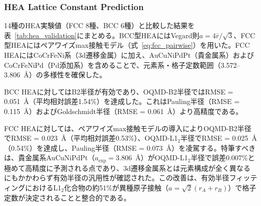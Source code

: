 \documentclass[a4paper,10pt,5p]{elsarticle}
\begin{document}
\subsubsection{HEA Lattice Constant Prediction}

14種のHEA実験値（FCC 8種、BCC 6種）と比較した結果を表~\ref{tab:hea_validation}にまとめる。BCC型HEAにはVegard則$a = 4\bar{r}/\sqrt{3}$、FCC型HEAにはペアワイズmax接触モデル（式~\ref{eq:fcc_pairwise}）を用いた。FCC HEAにはCoCrFeNi系（3d遷移金属）に加え、AuCuNiPdPt（貴金属系）およびCoCrFeNiPd（Pd添加系）を含めることで、元素系・格子定数範囲（3.572--3.806~\AA）の多様性を確保した。

BCC HEAに対してはB2半径が有効であり、OQMD-B2半径ではRMSE = 0.051~\AA（平均相対誤差1.54\%）を達成した。これはPauling半径（RMSE = 0.115~\AA）およびGoldschmidt半径（RMSE = 0.061~\AA）より高精度である。

FCC HEAに対しては、ペアワイズmax接触モデルの導入によりOQMD-B2半径でRMSE = 0.023~\AA（平均相対誤差0.53\%）、OQMD-L1$_2$半径でRMSE = 0.025~\AA（0.54\%）を達成し、Pauling半径（RMSE = 0.073~\AA）を凌駕する。特筆すべきは、貴金属系AuCuNiPdPt（$a_{\mathrm{exp}} = 3.806$~\AA）がOQMD-L1$_2$半径で誤差0.007\%と極めて高精度に予測される点であり、3d遷移金属系とは元素構成が全く異なるにもかかわらず有効半径の汎用性が確認された。この改善は、有効半径フィッティングにおけるL1$_2$化合物の約51\%が異種原子接触（$a = \sqrt{2}(r_A + r_B)$）で格子定数が決定されることと整合的である。

\begin{table}[htbp]
\small
    \centering
    \caption{HEA lattice constant prediction using structure-specific effective radii as descriptors. BCC HEAs: $a = 4\bar{r}/\sqrt{3}$, FCC HEAs: pairwise max-contact model (Eq.~\ref{eq:fcc_pairwise}). Representative entries are shown.}
    \label{tab:hea_validation}
\end{table}
\end{document}
